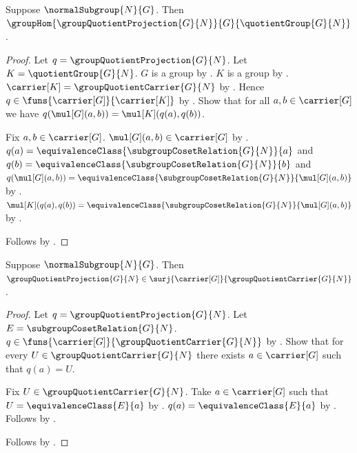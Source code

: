 \begin{theorem}\label{group_quotient_projection_hom}
    Suppose $\normalSubgroup{N}{G}$.
    Then
        $\groupHom
            {\groupQuotientProjection{G}{N}}
            {G}{\quotientGroup{G}{N}}$.
\end{theorem}
\begin{proof}
    Let $q=\groupQuotientProjection{G}{N}$.
    Let $K=\quotientGroup{G}{N}$.
    $G$ is a group by .
    $K$ is a group by .
    $\carrier[K]=\groupQuotientCarrier{G}{N}$ by
        .
    Hence $q\in\funs{\carrier[G]}{\carrier[K]}$ by
        .
    Show that for all $a,b\in\carrier[G]$ we have
        $q(\mul[G](a,b))=\mul[K](q(a),q(b))$.
    \begin{subproof}
        Fix $a,b\in\carrier[G]$.
        $\mul[G](a,b)\in\carrier[G]$ by
            .
        $q(a)=\equivalenceClass{\subgroupCosetRelation{G}{N}}{a}$ and
            $q(b)=\equivalenceClass{\subgroupCosetRelation{G}{N}}{b}$ and
            $q(\mul[G](a,b))=
                \equivalenceClass
                    {\subgroupCosetRelation{G}{N}}{\mul[G](a,b)}$ by
            .
        $\mul[K](q(a),q(b))=
            \equivalenceClass
                {\subgroupCosetRelation{G}{N}}{\mul[G](a,b)}$ by
            .
    \end{subproof}
    Follows by .
\end{proof}

\begin{theorem}\label{group_quotient_projection_surjective}
    Suppose $\normalSubgroup{N}{G}$.
    Then $\groupQuotientProjection{G}{N}\in
        \surj{\carrier[G]}{\groupQuotientCarrier{G}{N}}$.
\end{theorem}
\begin{proof}
    Let $q=\groupQuotientProjection{G}{N}$.
    Let $E=\subgroupCosetRelation{G}{N}$.
    $q\in\funs{\carrier[G]}{\groupQuotientCarrier{G}{N}}$ by
        .
    Show that for every $U\in\groupQuotientCarrier{G}{N}$ there exists
        $a\in\carrier[G]$ such that $q(a)=U$.
    \begin{subproof}
        Fix $U\in\groupQuotientCarrier{G}{N}$.
        Take $a\in\carrier[G]$ such that
            $U=\equivalenceClass{E}{a}$ by
            .
        $q(a)=\equivalenceClass{E}{a}$ by
            .
        Follows by \auto.
    \end{subproof}
    Follows by .
\end{proof}

